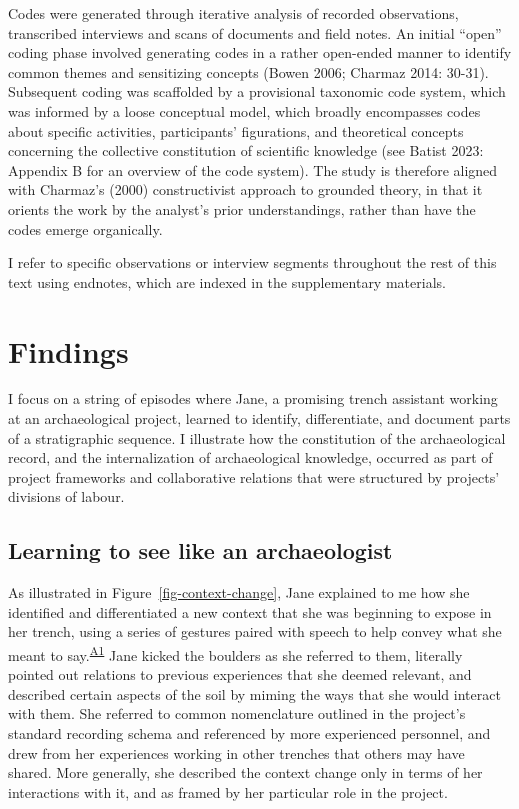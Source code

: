 \documentclass[
]{article}
\begin{document}
Codes were generated through iterative analysis of recorded
observations, transcribed interviews and scans of documents and field
notes. An initial ``open'' coding phase involved generating codes in a
rather open-ended manner to identify common themes and sensitizing
concepts (Bowen 2006; Charmaz 2014: 30-31). Subsequent coding was
scaffolded by a provisional taxonomic code system, which was informed by
a loose conceptual model, which broadly encompasses codes about specific
activities, participants' figurations, and theoretical concepts
concerning the collective constitution of scientific knowledge (see
Batist 2023: Appendix B for an overview of the code system). The study
is therefore aligned with Charmaz's (2000) constructivist approach to
grounded theory, in that it orients the work by the analyst's prior
understandings, rather than have the codes emerge organically.

I refer to specific observations or interview segments throughout the
rest of this text using endnotes, which are indexed in the supplementary
materials.

\section{Findings}\label{findings}

I focus on a string of episodes where Jane, a promising trench assistant
working at an archaeological project, learned to identify,
differentiate, and document parts of a stratigraphic sequence. I
illustrate how the constitution of the archaeological record, and the
internalization of archaeological knowledge, occurred as part of project
frameworks and collaborative relations that were structured by projects'
divisions of labour.

\subsection{Learning to see like an
archaeologist}\label{learning-to-see-like-an-archaeologist}

As illustrated in Figure~\ref{fig-context-change}, Jane explained to me
how she identified and differentiated a new context that she was
beginning to expose in her trench, using a series of gestures paired
with speech to help convey what she meant to
say.\textsuperscript{\hyperref[sec-A1]{A1}} Jane kicked the boulders as
she referred to them, literally pointed out relations to previous
experiences that she deemed relevant, and described certain aspects of
the soil by miming the ways that she would interact with them. She
referred to common nomenclature outlined in the project's standard
recording schema and referenced by more experienced personnel, and drew
from her experiences working in other trenches that others may have
shared. More generally, she described the context change only in terms
of her interactions with it, and as framed by her particular role in the
project.
\end{document}
